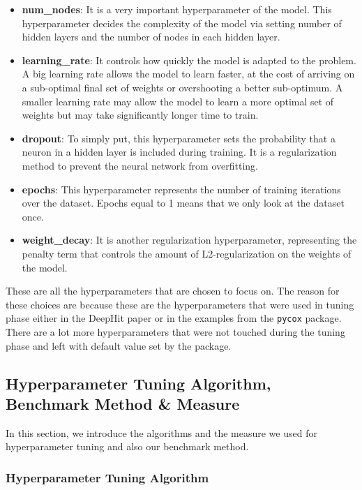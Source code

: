 \documentclass[
]{article}
\providecommand{\tightlist}{%
  \setlength{\itemsep}{0pt}\setlength{\parskip}{0pt}}
\begin{document}
\begin{itemize}
\tightlist
\item
  \textbf{num\_nodes}: It is a very important hyperparameter of the model. This hyperparameter decides the complexity of the model via setting number of hidden layers and the number of nodes in each hidden layer.
\item
  \textbf{learning\_rate}: It controls how quickly the model is adapted to the problem. A big learning rate allows the model to learn faster, at the cost of arriving on a sub-optimal final set of weights or overshooting a better sub-optimum. A smaller learning rate may allow the model to learn a more optimal set of weights but may take significantly longer time to train.
\item
  \textbf{dropout}: To simply put, this hyperparameter sets the probability that a neuron in a hidden layer is included during training. It is a regularization method to prevent the neural network from overfitting.
\item
  \textbf{epochs}: This hyperparameter represents the number of training iterations over the dataset. Epochs equal to 1 means that we only look at the dataset once.
\item
  \textbf{weight\_decay}: It is another regularization hyperparameter, representing the penalty term that controls the amount of L2-regularization on the weights of the model.
\end{itemize}

These are all the hyperparameters that are chosen to focus on. The reason for these choices are because these are the hyperparameters that were used in tuning phase either in the DeepHit paper or in the examples from the \texttt{pycox} package. There are a lot more hyperparameters that were not touched during the tuning phase and left with default value set by the package.

\hypertarget{hyperparameter-tuning-algorithm-benchmark-method-measure}{%
\subsection{Hyperparameter Tuning Algorithm, Benchmark Method \& Measure}\label{hyperparameter-tuning-algorithm-benchmark-method-measure}}

In this section, we introduce the algorithms and the measure we used for hyperparameter tuning and also our benchmark method.

\hypertarget{hyperparameter-tuning-algorithm}{%
\subsubsection{Hyperparameter Tuning Algorithm}\label{hyperparameter-tuning-algorithm}}
\end{document}
